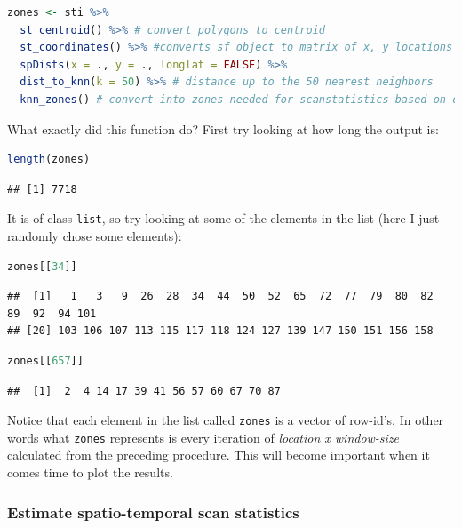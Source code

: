 \documentclass[
]{book}
\newcommand{\passthrough}[1]{#1}
\begin{document}
\begin{lstlisting}[language=R]
zones <- sti %>%
  st_centroid() %>% # convert polygons to centroid
  st_coordinates() %>% #converts sf object to matrix of x, y locations
  spDists(x = ., y = ., longlat = FALSE) %>%
  dist_to_knn(k = 50) %>% # distance up to the 50 nearest neighbors
  knn_zones() # convert into zones needed for scanstatistics based on distances
\end{lstlisting}

What exactly did this function do? First try looking at how long the output is:

\begin{lstlisting}[language=R]
length(zones)
\end{lstlisting}

\begin{lstlisting}
## [1] 7718
\end{lstlisting}

It is of class \passthrough{\lstinline!list!}, so try looking at some of the elements in the list (here I just randomly chose some elements):

\begin{lstlisting}[language=R]
zones[[34]]
\end{lstlisting}

\begin{lstlisting}
##  [1]   1   3   9  26  28  34  44  50  52  65  72  77  79  80  82  89  92  94 101
## [20] 103 106 107 113 115 117 118 124 127 139 147 150 151 156 158
\end{lstlisting}

\begin{lstlisting}[language=R]
zones[[657]]
\end{lstlisting}

\begin{lstlisting}
##  [1]  2  4 14 17 39 41 56 57 60 67 70 87
\end{lstlisting}

Notice that each element in the list called \passthrough{\lstinline!zones!} is a vector of row-id's. In other words what \passthrough{\lstinline!zones!} represents is every iteration of \emph{location x window-size} calculated from the preceding procedure. This will become important when it comes time to plot the results.

\hypertarget{estimate-spatio-temporal-scan-statistics}{%
\subsubsection{Estimate spatio-temporal scan statistics}\label{estimate-spatio-temporal-scan-statistics}}
\end{document}
